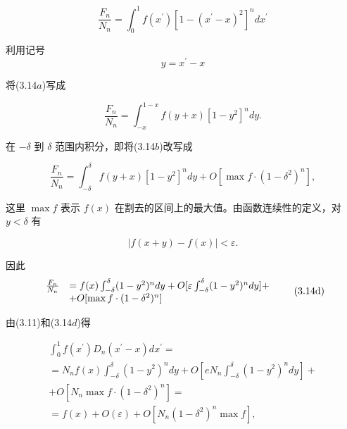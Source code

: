 \begin{equation*}
\frac {F _ {n}}{N _ {n}} = \int_ {0} ^ {1} f (x ^ {\prime}) [ 1 - (x ^ {\prime} - x) ^ {2} ] ^ {n} d x ^ {\prime}\tag{3.14a}
\end{equation*}

利用记号
\begin{equation*}
y = x ^ {\prime} - x
\end{equation*}

将(3.14$a$)写成

\begin{equation*}
\frac {F _ {n}}{N _ {n}} = \int_ {- x} ^ {1 - x} f (y + x) [ 1 - y ^ {2} ] ^ {n} d y.\tag{3.14b}
\end{equation*}

在 $-\delta$ 到 $\delta$ 范围内积分，即将(3.14$b$)改写成

\begin{equation*}
\frac {F _ {n}}{N _ {n}} = \int_ {- \delta} ^ {\delta} f (y + x) [ 1 - y ^ {2} ] ^ {n} d y + O [ \max f \cdot (1 - \delta^ {2}) ^ {n} ],\tag{3.14c}
\end{equation*}

这里 $\max f$ 表示 $f(x)$ 在割去的区间上的最大值。由函数连续性的定义，对 $y < \delta$ 有

\begin{equation*}
\left| f (x + y) - f (x) \right| <   \varepsilon .
\end{equation*}

因此
\begin{equation*}
\begin{array}{r l} \frac {F _ {n}}{N _ {n}} & = f (x) \int_ {- \delta} ^ {\delta} (1 - y ^ {2}) ^ {n} d y + O [ \varepsilon \int_ {- \delta} ^ {\delta} (1 - y ^ {2}) ^ {n} d y ] + \\ & + O [ \max f \cdot (1 - \delta^ {2}) ^ {n} ] \end{array} \tag{3.14d}
\end{equation*}

由(3.11)和(3.14$d$)得

\begin{equation*}
\begin{array}{l} \int_ {0} ^ {1} f (x ^ {\prime}) D _ {n} (x ^ {\prime} - x) d x ^ {\prime} = \\ = N _ {n} f (x) \int_ {- \delta} ^ {\delta} (1 - y ^ {2}) ^ {n} d y + O [ e N _ {n} \int_ {- \delta} ^ {\delta} (1 - y ^ {2}) ^ {n} d y ] + \\ + O [ N _ {n} \max f \cdot (1 - \delta^ {2}) ^ {n} ] = \\ = f (x) + O (\varepsilon) + O [ N _ {n} (1 - \delta^ {2}) ^ {n} \max f ], \end{array} \tag{3.15}
\end{equation*}

